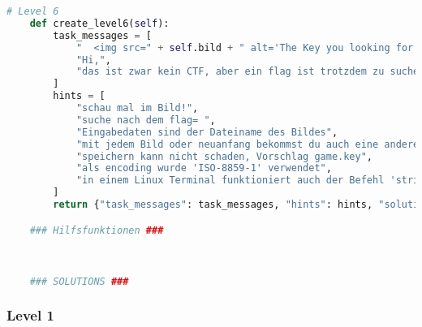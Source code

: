 \documentclass[a4paper 11pt]{article}
\begin{document}
\begin{lstlisting}[language=python, caption=Genereller Escape-Room]
    # Level 6
    def create_level6(self):
        task_messages = [
            "  <img src=" + self.bild + " alt='The Key you looking for' height='200'/> ",
            "Hi,",
			"das ist zwar kein CTF, aber ein flag ist trotzdem zu suchen"
        ]
        hints = [
            "schau mal im Bild!",
            "suche nach dem flag= ",
            "Eingabedaten sind der Dateiname des Bildes",
            "mit jedem Bild oder neuanfang bekommst du auch eine andere flag",
            "speichern kann nicht schaden, Vorschlag game.key",
            "als encoding wurde 'ISO-8859-1' verwendet",
            "in einem Linux Terminal funktioniert auch der Befehl 'strings [Dateiname]' "
        ]
        return {"task_messages": task_messages, "hints": hints, "solution_function": STEGO.im_bild_finden, "data": self.bild}

    ### Hilfsfunktionen ###
    


    ### SOLUTIONS ###


\end{lstlisting}
\flushleft

\subsubsection{Level 1}
\end{document}
